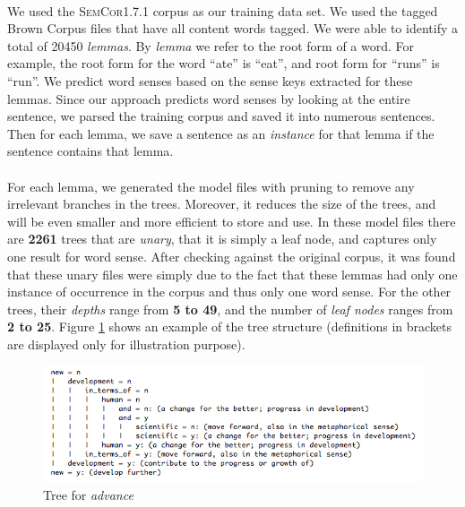 \paragraph{}
We used the \textsc{SemCor1.7.1} corpus as our training data set. We used the tagged Brown Corpus files that have all content words tagged. We were able to identify a total of 20450 \textit{lemmas}. By \textit{lemma} we refer to the root form of a word.  For example, the root form for the word ``ate'' is ``eat'', and root form for ``runs'' is ``run''. We predict word senses based on the sense keys extracted for these lemmas. Since our approach predicts word senses by looking at the entire sentence, we parsed the training corpus and saved it into numerous sentences. Then for each lemma, we save a sentence as an \textit{instance} for that lemma if the sentence contains that lemma.

\paragraph{}
For each lemma, we generated the model files with pruning to remove any irrelevant branches in the trees. Moreover, it%
 reduces the size of the trees, and will be even smaller and more efficient to store and use. In these model files there are \textbf{2261} trees that are \textit{unary}, that it is simply a leaf node, and  captures only one result for word sense. After checking against the original corpus, it was found that these unary files were simply due to the fact that these lemmas had only one instance of occurrence in the corpus and thus only one word sense. For the other trees, their \textit{depths} range from \textbf{5 to 49}, and the number of \textit{leaf nodes} ranges from \textbf{2 to 25}. Figure \ref{fig:treeAdvance} shows an example of the tree structure (definitions in brackets are displayed only for illustration purpose).

\begin{figure}[h]
  \centering
  \includegraphics[scale=0.75]{./advance}
  \caption{Tree for \textit{advance}}
  \label{fig:treeAdvance}
\end{figure}

